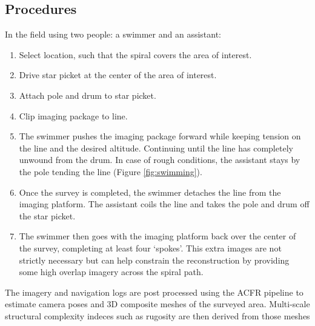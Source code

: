 \subsection{Procedures}

In the field using two people: a swimmer and an assistant:\begin{enumerate}
\item Select location, such that the spiral covers the area of interest.
\item Drive star picket at the center of the area of interest. 
\item Attach pole and drum to star picket.
\item Clip imaging package to line.
\item The swimmer pushes the imaging package forward while keeping tension on the line and the desired altitude. Continuing until the line has completely unwound from the drum. In case of rough conditions, the assistant stays by the pole tending the line (Figure \ref{fig:swimming}).
\item Once the survey is completed, the swimmer detaches the line from the imaging platform. The assistant coils the line and takes the pole and drum off the star picket. 
\item The swimmer then goes with the imaging platform back over the center of the survey, completing at least four `spokes'. This extra images are not strictly necessary but can help constrain the reconstruction by providing some high overlap imagery across the spiral path.
\end{enumerate}

The imagery and navigation logs are post processed using the ACFR pipeline \cite{Johnson_Roberson_2010} \cite{Mahon_2008} \cite{Johnson_Roberson_2013} to estimate camera poses and 3D composite meshes of the surveyed area. Multi-scale structural complexity indeces such as rugosity are then derived from those meshes \cite{Friedman_2012} 
